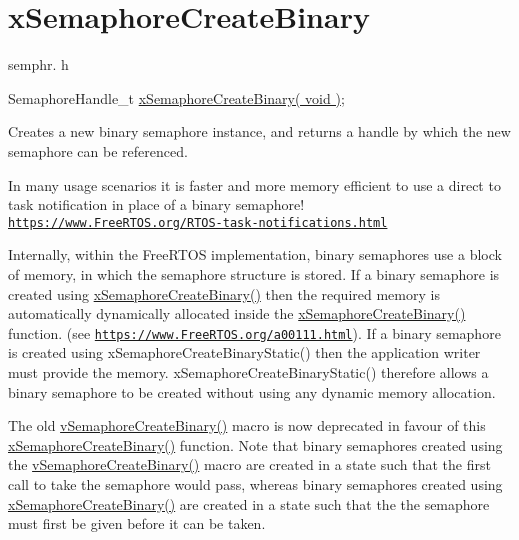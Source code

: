 \hypertarget{group__x_semaphore_create_binary}{}\section{x\+Semaphore\+Create\+Binary}
\label{group__x_semaphore_create_binary}
semphr. h 
\begin{DoxyPre}
SemaphoreHandle\_t \hyperlink{vendor_2ceedling_2plugins_2freertos_2src_2freertos_2include_2semphr_8h_acba963695e4f159d9bfa2394cae5badc}{xSemaphoreCreateBinary( void )};
\end{DoxyPre}


Creates a new binary semaphore instance, and returns a handle by which the new semaphore can be referenced.

In many usage scenarios it is faster and more memory efficient to use a direct to task notification in place of a binary semaphore! \href{https://www.FreeRTOS.org/RTOS-task-notifications.html}{\tt https\+://www.\+Free\+R\+T\+O\+S.\+org/\+R\+T\+O\+S-\/task-\/notifications.\+html}

Internally, within the Free\+R\+T\+OS implementation, binary semaphores use a block of memory, in which the semaphore structure is stored. If a binary semaphore is created using \hyperlink{vendor_2ceedling_2plugins_2freertos_2src_2freertos_2include_2semphr_8h_acba963695e4f159d9bfa2394cae5badc}{x\+Semaphore\+Create\+Binary()} then the required memory is automatically dynamically allocated inside the \hyperlink{vendor_2ceedling_2plugins_2freertos_2src_2freertos_2include_2semphr_8h_acba963695e4f159d9bfa2394cae5badc}{x\+Semaphore\+Create\+Binary()} function. (see \href{https://www.FreeRTOS.org/a00111.html}{\tt https\+://www.\+Free\+R\+T\+O\+S.\+org/a00111.\+html}). If a binary semaphore is created using x\+Semaphore\+Create\+Binary\+Static() then the application writer must provide the memory. x\+Semaphore\+Create\+Binary\+Static() therefore allows a binary semaphore to be created without using any dynamic memory allocation.

The old \hyperlink{vendor_2ceedling_2plugins_2freertos_2src_2freertos_2include_2semphr_8h_ae10bffadd26fbd5bcce76bf33a83ef30}{v\+Semaphore\+Create\+Binary()} macro is now deprecated in favour of this \hyperlink{vendor_2ceedling_2plugins_2freertos_2src_2freertos_2include_2semphr_8h_acba963695e4f159d9bfa2394cae5badc}{x\+Semaphore\+Create\+Binary()} function. Note that binary semaphores created using the \hyperlink{vendor_2ceedling_2plugins_2freertos_2src_2freertos_2include_2semphr_8h_ae10bffadd26fbd5bcce76bf33a83ef30}{v\+Semaphore\+Create\+Binary()} macro are created in a state such that the first call to \textquotesingle{}take\textquotesingle{} the semaphore would pass, whereas binary semaphores created using \hyperlink{vendor_2ceedling_2plugins_2freertos_2src_2freertos_2include_2semphr_8h_acba963695e4f159d9bfa2394cae5badc}{x\+Semaphore\+Create\+Binary()} are created in a state such that the the semaphore must first be \textquotesingle{}given\textquotesingle{} before it can be \textquotesingle{}taken\textquotesingle{}.

